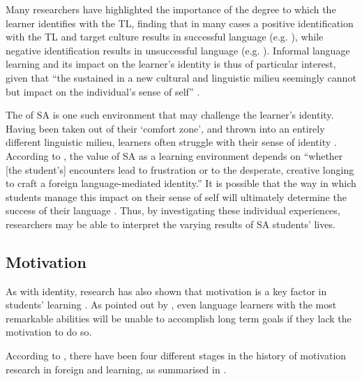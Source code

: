 \documentclass[output=paper]{langsci/langscibook}
\begin{document}
Many researchers have highlighted the importance of the degree to which the learner identifies with the TL, finding that in many cases a positive identification with the TL and target culture results in successful language  (e.g. \citealt{Regan2013,Norton2000,NestorRegan2011,NestorEtAl2012}), while negative identification results in unsuccessful language  (e.g. \citealt{Norton2000,Block2006}). Informal language learning and its impact on the learner’s identity is thus of particular interest, given that “the sustained  in a new cultural and {linguistic} milieu seemingly cannot but impact on the individual’s sense of self” \citep[109]{Block2007}.

The  of SA is one such environment that may challenge the learner’s identity. Having been taken out of their ‘comfort zone’, and thrown into an entirely different {linguistic} milieu, learners often struggle with their sense of identity \citep{Jackson2008b}. According to \citet[202]{Kinginger2009}, the value of SA as a learning environment depends on “whether [the student’s] encounters lead to frustration or to the desperate, creative longing to craft a foreign language-mediated identity.” It is possible that the way in which students manage this impact on their sense of self will ultimately determine the success of their language . Thus, by investigating these individual experiences, researchers may be able to interpret the varying results of SA students' lives.



\subsection{Motivation}


As with identity, research has also shown that motivation is a key factor in students’ learning \citep{Keblawi2009}. As pointed out by \citet{Dörnyei2014}, even language learners with the most remarkable abilities will be unable to accomplish long term goals if they lack the motivation to do so.  

According to \citet{UshiodaDörnyei2012}, there have been four different stages in the history of motivation research in foreign  and learning, as summarised in . 
\end{document}
